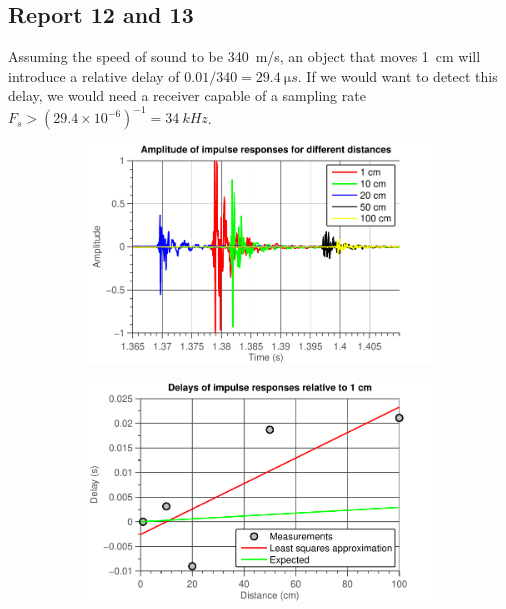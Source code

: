 \documentclass[11pt,titlepage]{report}
\begin{document}

\subsection{Report 12 and 13}
\label{subsec:ass1-rep-12-13}
Assuming the speed of sound to be \SI{340}{m/s}, an object that moves \SI{1}{cm} will introduce a relative delay of $0.01/340 = \SI{29.4}{\micro s}$. If we would want to detect this delay, we would need a receiver capable of a sampling rate $F_s > (29.4 \times 10^{-6})^{-1} = \SI{34}{kHz}$.

\begin{figure}[H]
	\centering
	\begin{subfigure}{0.49\textwidth}
		\includegraphics[width=\textwidth]{../../deliverable-7-resources/figures/ass-1/report-11-12-13/ass-1-report-13-time.pdf}
	\end{subfigure}
	\begin{subfigure}{0.49\textwidth}
		\includegraphics[width=\textwidth]{../../deliverable-7-resources/figures/ass-1/report-11-12-13/ass-1-report-13-delays.pdf}

\end{subfigure}
\end{figure}
\end{document}
